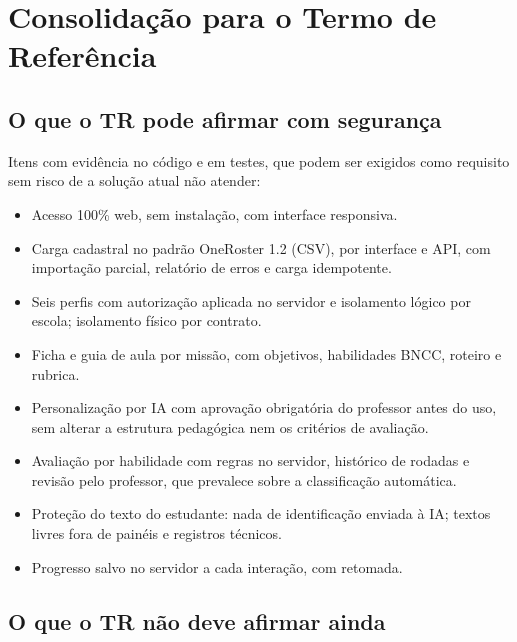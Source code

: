 \chapter{Consolidação para o Termo de Referência}
\label{cap:consolidacao}

\section{O que o TR pode afirmar com segurança}

Itens com evidência no código e em testes, que podem ser exigidos como
requisito sem risco de a solução atual não atender:

\begin{itemize}
  \item Acesso 100\% web, sem instalação, com interface responsiva.
  \item Carga cadastral no padrão OneRoster 1.2 (CSV), por interface e API,
    com importação parcial, relatório de erros e carga idempotente.
  \item Seis perfis com autorização aplicada no servidor e isolamento lógico
    por escola; isolamento físico por contrato.
  \item Ficha e guia de aula por missão, com objetivos, habilidades BNCC,
    roteiro e rubrica.
  \item Personalização por IA com aprovação obrigatória do professor antes do
    uso, sem alterar a estrutura pedagógica nem os critérios de avaliação.
  \item Avaliação por habilidade com regras no servidor, histórico de rodadas
    e revisão pelo professor, que prevalece sobre a classificação
    automática.
  \item Proteção do texto do estudante: nada de identificação enviada à IA;
    textos livres fora de painéis e registros técnicos.
  \item Progresso salvo no servidor a cada interação, com retomada.
\end{itemize}

\section{O que o TR não deve afirmar ainda}

